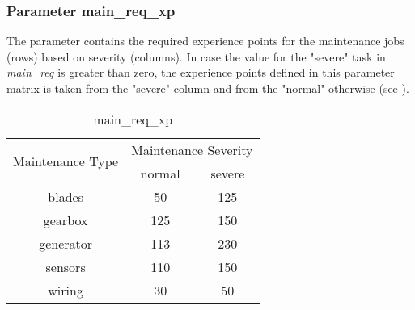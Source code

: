         \subsubsection{Parameter main\_req\_xp}
        The parameter contains the required experience points for the maintenance jobs (rows) 
        based on severity (columns). In case the value for the "severe" task in \textit{main\_req} 
        is greater than zero, the experience points defined in this parameter matrix is taken from
        the "severe" column and from the "normal" otherwise (see ). 
        \begin{table}[H]
            \begin{center}
                \begin{tabular}{ |c|c|c| } 
                \hline
                \multirow{2}{*}{Maintenance Type} &
                \multicolumn{2}{|c|}{Maintenance Severity}\\
                \cline{2-2}\cline{3-3}
                & normal & severe \\ 
                \hline
                blades    & 50  & 125  \\ 
                gearbox   & 125 & 150  \\ 
                generator & 113 & 230 \\ 
                sensors   & 110 & 150  \\ 
                wiring    & 30  & 50  \\ 
                \hline
                \end{tabular}
            \end{center}
        \caption{main\_req\_xp} %
        \label{param_main_req} %
        \end{table}

